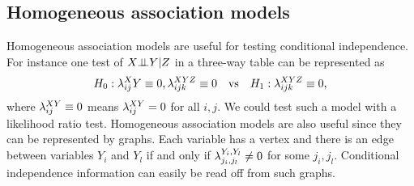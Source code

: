 \subsection{Homogeneous association models}
Homogeneous association models are useful for testing conditional independence. For instance one test of $X {\perp\!\!\!\perp} Y|Z$ in a three-way table can be represented as 
\[H_0 : \lambda_{ij}^XY \equiv 0, \lambda_{ijk}^{XYZ}\equiv 0 ~~~\text{vs}~~~H_1 : \lambda^{XYZ}_{ijk}\equiv 0, \]
where $\lambda^{XY}_{ij}\equiv 0$ means $\lambda^{XY}_{ij}=0$ for all $i,j$. We could test such a model with a likelihood ratio test. Homogeneous association models are also useful since they can be represented by graphs. Each variable has a vertex and there is an edge between variables $Y_i$ and $Y_l$ if and only if $\lambda^{Y_i,Y_l}_{j_i,j_l} \neq 0$ for some $j_i,j_l$. Conditional independence information can easily be read off from such graphs. 
